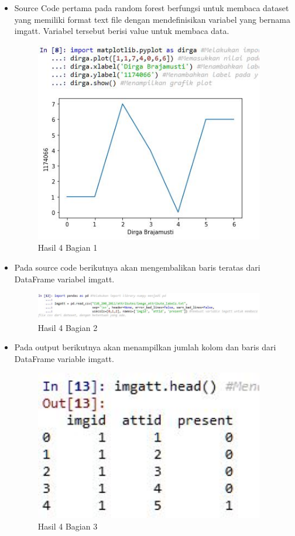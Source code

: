 \begin{itemize}
\item Source Code pertama pada random forest berfungsi untuk membaca dataset yang memiliki format text file dengan mendefinisikan variabel yang bernama imgatt. Variabel tersebut berisi value untuk membaca data.

\begin{figure}[H]
\centerline{\includegraphics[width=10cm]{figures/1174066/3/6.jpg}}
\caption{Hasil 4 Bagian 1}
\label{labelgambar}
\end{figure}

\item Pada source code berikutnya akan mengembalikan baris teratas dari DataFrame variabel imgatt.

\begin{figure}[H]
\centerline{\includegraphics[width=10cm]{figures/1174066/3/7.jpg}}
\caption{Hasil 4 Bagian 2}
\label{labelgambar}
\end{figure}

\item Pada output berikutnya akan menampilkan jumlah kolom dan baris dari DataFrame variable imgatt.

\begin{figure}[H]
\centerline{\includegraphics[width=10cm]{figures/1174066/3/8.jpg}}
\caption{Hasil 4 Bagian 3}
\label{labelgambar}
\end{figure}


\end{itemize}
